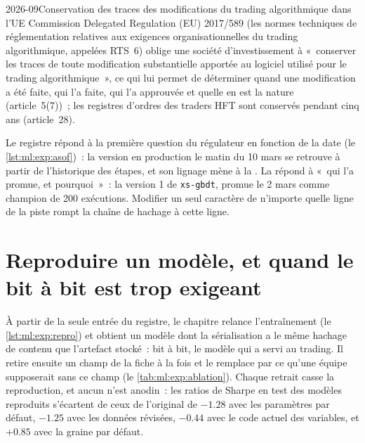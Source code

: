 \begin{dated}{2026-09}{Conservation des traces des modifications du trading algorithmique dans l'UE}\label{dat:ml:experiment-tracking-and-reproducibility:rts6}
Commission Delegated Regulation (EU) 2017/589 (les normes techniques de réglementation relatives aux exigences organisationnelles
du trading algorithmique, appelées RTS~6) oblige une société d'investissement à «~conserver les traces de toute modification substantielle apportée au logiciel
utilisé pour le trading algorithmique~», ce qui lui permet de déterminer quand une modification a été faite, qui l'a faite, qui l'a approuvée et quelle en est la nature
(article~5(7))~; les registres d'ordres des traders HFT sont conservés pendant cinq ans (article~28).
\end{dated}

Le registre répond à la première question du régulateur en fonction de la date (le \cref{lst:ml:exp:asof})~: la version en production le matin
du 10 mars se retrouve à partir de l'historique des étapes, et son lignage mène à la . La  répond à «~qui l'a promue,
et pourquoi~»~: la version 1 de \texttt{xs-gbdt}, promue le 2 mars comme champion de 200 exécutions.
Modifier un seul caractère de n'importe quelle ligne de la piste rompt la chaîne de hachage à cette ligne.

\section{Reproduire un modèle, et quand le bit à bit est trop exigeant}

À partir de la seule entrée du registre, le chapitre relance l'entraînement (le \cref{lst:ml:exp:repro}) et obtient un modèle dont la sérialisation a le
même hachage de contenu que l'artefact stocké~: bit à bit, le modèle qui a servi au trading. Il retire ensuite un champ de la fiche à la
fois et le remplace par ce qu'une équipe supposerait sans ce champ (le \cref{tab:ml:exp:ablation}). Chaque retrait casse la reproduction, et
aucun n'est anodin~: les ratios de Sharpe en test des modèles reproduits s'écartent de ceux de l'original de $-1.28$ avec les paramètres par défaut,
$-1.25$ avec les données révisées, $-0.44$ avec le code actuel des variables, et $+0.85$ avec la graine par défaut.

